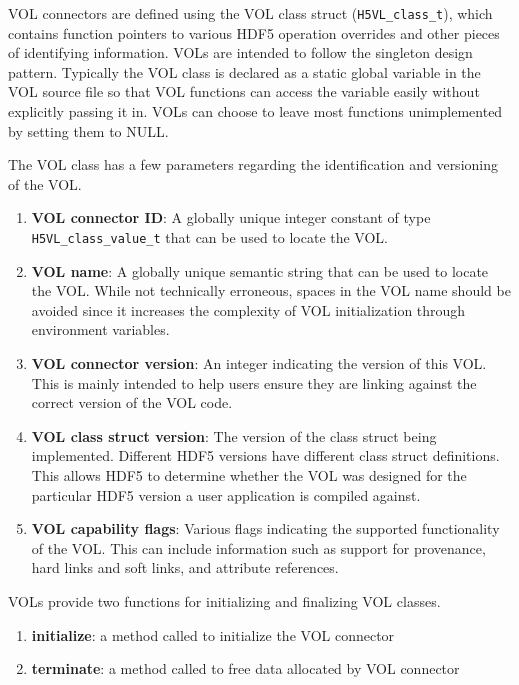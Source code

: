 VOL connectors are defined using the VOL class struct (\texttt{H5VL\_class\_t}), which contains function pointers to various HDF5 operation overrides and other pieces of identifying information. VOLs are intended to follow the singleton design pattern. Typically the VOL class is declared as a static global variable in the VOL source file so that VOL functions can access the variable easily without explicitly passing it in. VOLs can choose to leave most functions unimplemented by setting them to NULL.

The VOL class has a few parameters regarding the identification and versioning of the VOL.
\begin{enumerate}
    \item \textbf{VOL connector ID}: A globally unique integer constant of type \texttt{H5VL\_class\_value\_t} that can be used to locate the VOL.
    \item \textbf{VOL name}: A globally unique semantic string that can be used to locate the VOL. While not technically erroneous, spaces in the VOL name should be avoided since it increases the complexity of VOL initialization through environment variables.
    \item \textbf{VOL connector version}: An integer indicating the version of this VOL. This is mainly intended to help users ensure they are linking against the correct version of the VOL code.
    \item \textbf{VOL class struct version}: The version of the class struct being implemented. Different HDF5 versions have different class struct definitions. This allows HDF5 to determine whether the VOL was designed for the particular HDF5 version a user application is compiled against.
    \item \textbf{VOL capability flags}: Various flags indicating the supported functionality of the VOL. This can include information such as support for provenance, hard links and soft links, and attribute references.
\end{enumerate}

VOLs provide two functions for initializing and finalizing VOL classes.
\begin{enumerate}
    \item \textbf{initialize}: a method called to initialize the VOL connector
    \item \textbf{terminate}: a method called to free data allocated by VOL connector
\end{enumerate}


